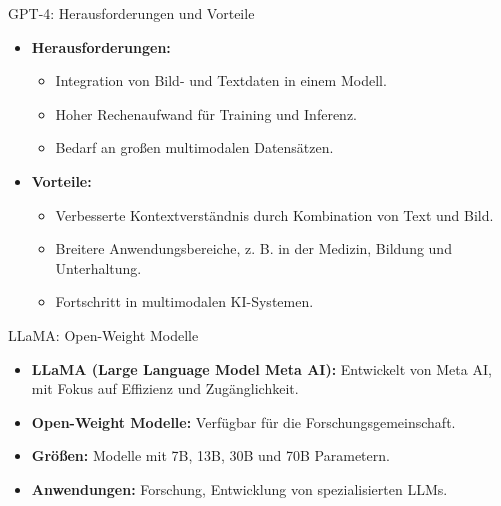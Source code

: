 \documentclass[aspectratio=1610, xcolor=dvipsnames, 9pt]{beamer}
\begin{document}
\begin{frame}{GPT-4: Herausforderungen und Vorteile}
  \begin{itemize}
    \item \textbf{Herausforderungen:}
      \begin{itemize}
        \item Integration von Bild- und Textdaten in einem Modell.
        \item Hoher Rechenaufwand für Training und Inferenz.
        \item Bedarf an großen multimodalen Datensätzen.
      \end{itemize}
    \item \textbf{Vorteile:}
      \begin{itemize}
        \item Verbesserte Kontextverständnis durch Kombination von Text und Bild.
        \item Breitere Anwendungsbereiche, z. B. in der Medizin, Bildung und Unterhaltung.
        \item Fortschritt in multimodalen KI-Systemen.
      \end{itemize}
  \end{itemize}
\end{frame}

\begin{frame}{LLaMA: Open-Weight Modelle}
  \begin{itemize}
    \item \textbf{LLaMA (Large Language Model Meta AI):} Entwickelt von Meta AI, mit Fokus auf Effizienz und Zugänglichkeit.
    \item \textbf{Open-Weight Modelle:} Verfügbar für die Forschungsgemeinschaft.
    \item \textbf{Größen:} Modelle mit 7B, 13B, 30B und 70B Parametern.
    \item \textbf{Anwendungen:} Forschung, Entwicklung von spezialisierten LLMs.
  \end{itemize}
\end{frame}
\end{document}
